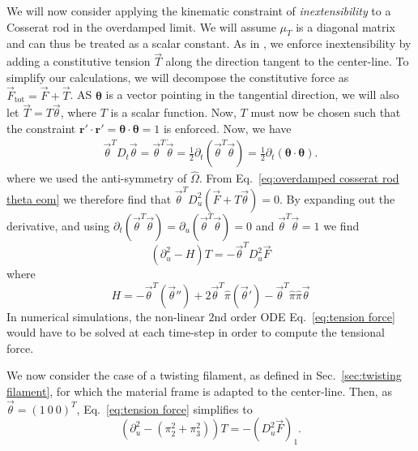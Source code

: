 We will now consider applying the kinematic constraint of \textit{inextensibility} to a Cosserat rod in the overdamped limit. We will assume $\mu_T$ is a diagonal matrix and can thus be treated as a scalar constant. As in \citep{powersDynamicsFilamentsMembranes2010, goldsteinNonlinearDynamicsStiff1995, nordgrenComputationMotionElastic1974}, we enforce inextensibility by adding a constitutive tension $\vec{T}$ along the direction tangent to the center-line. To simplify our calculations, we will decompose the constitutive force as $\vec{F}_\text{tot} = \vec{F} + \vec{T}$. AS $\boldsymbol{\theta}$ is a vector pointing in the tangential direction, we will also let $\vec{T} = T \vec{\theta}$, where $T$ is a scalar function. Now, $T$ must now be chosen such that the constraint $\mathbf{r}' \cdot \mathbf{r}' = \boldsymbol{\theta} \cdot \boldsymbol{\theta} = 1$ is enforced. Now, we have
\begin{equation}
	\begin{aligned}
		\vec{\theta}^T D_t \vec{\theta} = \vec{\theta}^T \dot{\vec{\theta}} = \frac{1}{2} \partial_t (\vec{\theta}^T {\vec{\theta}}) = \frac{1}{2} \partial_t (\boldsymbol{\theta} \cdot \boldsymbol{\theta}).
	\end{aligned}
\end{equation}
where we used the anti-symmetry of $\hat{\Omega}$. From Eq.~\ref{eq:overdamped cosserat rod theta eom} we therefore find that $\vec{\theta}^T D_u^2 (\vec{F} + T \vec{\theta}) = 0$. By expanding out the derivative, and using $\partial_t (\vec{\theta}^T \vec{\theta}) = \partial_u (\vec{\theta}^T \vec{\theta}) = 0$ and $\vec{\theta}^T \vec{\theta} = 1$ we find
\begin{equation} \label{eq:tension force}
	(\partial_u^2 - H) T = - \vec{\theta}^T D_u^2 \vec{F}
\end{equation}
where
\begin{equation}
	H=- \vec{\theta}^T (\vec{\theta}'') + 2 \vec{\theta}^T \hat{\pi} (\vec{\theta}') - \vec{\theta}^T \hat{\pi} \hat{\pi} \vec{\theta}
\end{equation}
In numerical simulations, the non-linear $2$nd order ODE Eq.~\ref{eq:tension force} would have to be solved at each time-step in order to compute the tensional force.

We now consider the case of a twisting filament, as defined in Sec.~\ref{sec:twisting filament}, for which the material frame is adapted to the center-line. Then, as $\vec{\theta} = (1\ 0\ 0)^T$, Eq.~\ref{eq:tension force} simplifies to
\begin{equation}
	\left( \partial_u^2 - (\pi_2^2 + \pi_3^2) \right) T = - (D_u^2 \vec{F})_1.
\end{equation}


